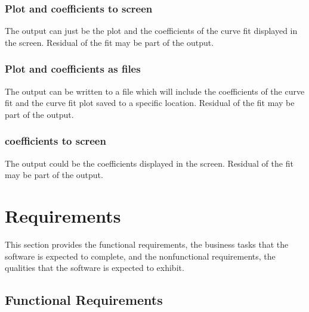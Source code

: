 \documentclass[12pt]{article}
\begin{document}
\subsubsection{Plot and coefficients to screen}

The output can just be the plot and the coefficients of the curve fit displayed 
in the screen. Residual of the fit may be part of the output.

\subsubsection{Plot and coefficients as files}

The output can be written to a file which will include the coefficients of the 
curve fit and the curve fit plot saved to a specific location. Residual of the 
fit may be part of the output.

\subsubsection{coefficients to screen}
The output could be the coefficients displayed in the screen. Residual of the 
fit may be part of the output.


\section{Requirements}

This section provides the functional requirements, the business tasks that the
software is expected to complete, and the nonfunctional requirements, the
qualities that the software is expected to exhibit.

\subsection{Functional Requirements}


\end{document}
